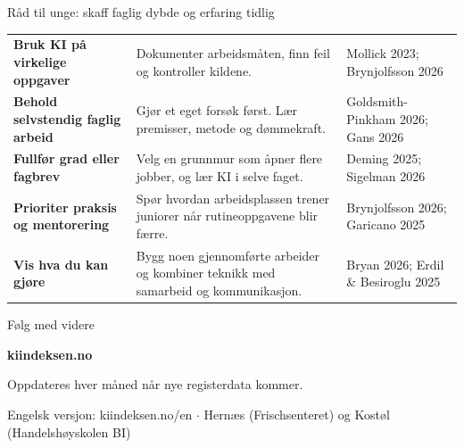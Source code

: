 \begin{frame}{Råd til unge: skaff faglig dybde og erfaring tidlig}
\footnotesize
\setlength{\tabcolsep}{6pt}
\renewcommand{\arraystretch}{1.5}
\begin{tabular}{p{3.9cm} p{7.1cm} p{2.6cm}}
\textbf{\textcolor{illInk}{Bruk KI på virkelige oppgaver}} & Dokumenter arbeidsmåten, finn feil og kontroller kildene. & {\tiny\textcolor{illGray}{Mollick 2023; Brynjolfsson 2026}} \\
\textbf{\textcolor{illInk}{Behold selvstendig faglig arbeid}} & Gjør et eget forsøk først. Lær premisser, metode og dømmekraft. & {\tiny\textcolor{illGray}{Goldsmith-Pinkham 2026; Gans 2026}} \\
\textbf{\textcolor{illInk}{Fullfør grad eller fagbrev}} & Velg en grunnmur som åpner flere jobber, og lær KI i selve faget. & {\tiny\textcolor{illGray}{Deming 2025; Sigelman 2026}} \\
\textbf{\textcolor{illInk}{Prioriter praksis og mentorering}} & Spør hvordan arbeidsplassen trener juniorer når rutineoppgavene blir færre. & {\tiny\textcolor{illGray}{Brynjolfsson 2026; Garicano 2025}} \\
\textbf{\textcolor{illInk}{Vis hva du kan gjøre}} & Bygg noen gjennomførte arbeider og kombiner teknikk med samarbeid og kommunikasjon. & {\tiny\textcolor{illGray}{Bryan 2026; Erdil \& Besiroglu 2025}} \\
\end{tabular}
\end{frame}

\begin{frame}{Følg med videre}
\centering
{}

\vspace{0.6em}
{\LARGE\bfseries\textcolor{illInk}{kiindeksen.no}}

\vspace{0.8em}
\large
Oppdateres hver måned når nye registerdata kommer.

\vspace{1.2em}
\footnotesize
Engelsk versjon: kiindeksen.no/en \quad $\cdot$ \quad Hernæs (Frischsenteret) og Kostøl (Handelshøyskolen BI)
\end{frame}

